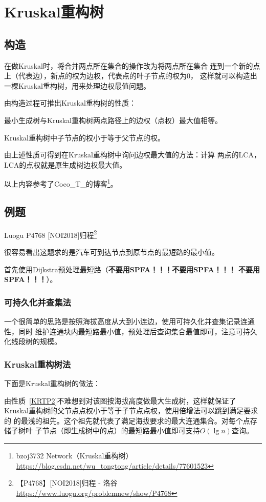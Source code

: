 \section{Kruskal重构树}
\subsection{构造}
在做Kruskal时，将合并两点所在集合的操作改为将两点所在集合
连到一个新的点上（代表边），新点的权为边权，代表点的叶子节点的权为0，
这样就可以构造出一棵Kruskal重构树，用来处理边权最值问题。

由构造过程可推出Kruskal重构树的性质：

\begin{property}
	最小生成树与Kruskal重构树两点路径上的边权（点权）最大值相等。
\end{property}
\begin{property}\label{KRTP2}
	Kruskal重构树中子节点的权小于等于父节点的权。
\end{property}
由上述性质可得到在Kruskal重构树中询问边权最大值的方法：计算
两点的LCA，LCA的点权就是原生成树边权最大值。

以上内容参考了Coco\_T\_的博客\footnote{
	bzoj3732 Network（Kruskal重构树）
	\url{https://blog.csdn.net/wu_tongtong/article/details/77601523}
}。
\subsection{例题}
Luogu P4768 [NOI2018]归程\footnote{
【P4768】[NOI2018]归程 - 洛谷
\url{https://www.luogu.org/problemnew/show/P4768}
}

很容易看出这题求的是汽车可到达节点到原节点的最短路的最小值。

首先使用Dijkstra预处理最短路（{\bfseries 不要用SPFA！！！不要用SPFA！！！
不要用SPFA！！！}）。

\subsubsection{可持久化并查集法}
一个很简单的思路是按照海拔高度从大到小连边，使用可持久化并查集记录连通性，同时
维护连通块内最短路最小值，预处理后查询集合最值即可，注意可持久化线段树的规模。

\subsubsection{Kruskal重构树法}
下面是Kruskal重构树的做法：

由性质~\ref{KRTP2}不难想到对该图按海拔高度做最大生成树，这样就保证了
Kruskal重构树的父节点点权小于等于子节点点权，使用倍增法可以跳到满足要求的
的最浅的祖先。这个祖先就代表了满足海拔要求的最大连通集合。对每个点存储子树叶
子节点（即生成树中的点）的最短路最小值即可支持$O(\lg n)$查询。

